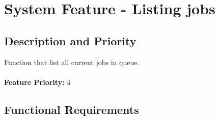 \documentclass{scrreprt}
\begin{document}
\section{System Feature - Listing jobs }


\subsection{Description and Priority}

Function that list all current jobs in queue.
\\
\\
\textbf{Feature Priority: } 4

\subsection{Functional Requirements}
\end{document}
